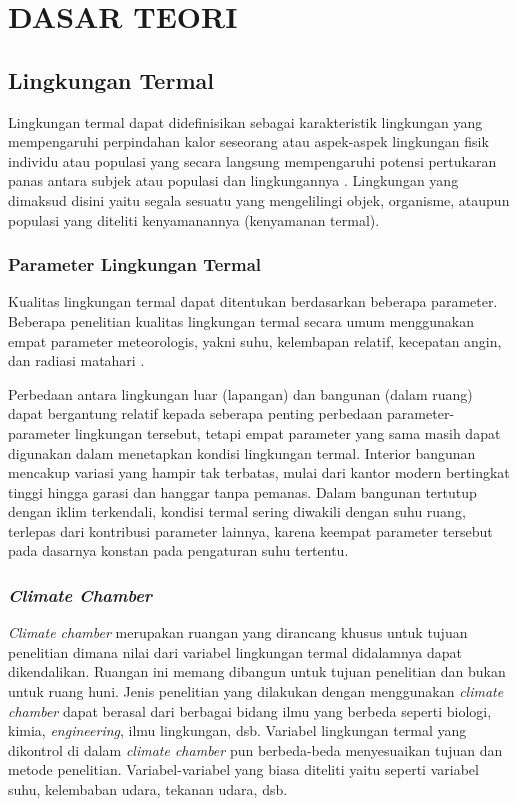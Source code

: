 \chapter{DASAR TEORI}
\label{dasar-teori}

\section{Lingkungan Termal}

Lingkungan termal dapat didefinisikan sebagai karakteristik lingkungan yang mempengaruhi perpindahan kalor seseorang \cite{ASHRAE55} atau aspek-aspek lingkungan fisik individu atau populasi yang secara langsung mempengaruhi potensi pertukaran panas antara subjek atau populasi dan lingkungannya \cite{book1}. Lingkungan yang dimaksud disini yaitu segala sesuatu yang mengelilingi objek, organisme, ataupun populasi yang diteliti kenyamanannya (kenyamanan termal).

\subsection{Parameter Lingkungan Termal}

Kualitas lingkungan termal dapat ditentukan berdasarkan beberapa parameter. Beberapa penelitian kualitas lingkungan termal secara umum menggunakan empat parameter meteorologis, yakni suhu, kelembapan relatif, kecepatan angin, dan radiasi matahari \cite{book1}.

Perbedaan antara lingkungan luar (lapangan) dan bangunan (dalam ruang) dapat bergantung relatif kepada seberapa penting perbedaan parameter-parameter lingkungan tersebut, tetapi empat parameter yang sama masih dapat digunakan dalam menetapkan kondisi lingkungan termal. Interior bangunan mencakup variasi yang hampir tak terbatas, mulai dari kantor modern bertingkat tinggi hingga garasi dan hanggar tanpa pemanas. Dalam bangunan tertutup dengan iklim terkendali, kondisi termal sering diwakili dengan suhu ruang, terlepas dari kontribusi parameter lainnya, karena keempat parameter tersebut pada dasarnya konstan pada pengaturan suhu tertentu.

\subsection{\textit{Climate Chamber}}

\textit{Climate chamber} merupakan ruangan yang dirancang khusus untuk tujuan penelitian dimana nilai dari variabel lingkungan termal didalamnya dapat dikendalikan. Ruangan ini memang dibangun untuk tujuan penelitian dan bukan untuk ruang huni. Jenis penelitian yang dilakukan dengan menggunakan \textit{climate chamber} dapat berasal dari berbagai bidang ilmu yang berbeda seperti biologi, kimia, \textit{engineering}, ilmu lingkungan, dsb. Variabel lingkungan termal yang dikontrol di dalam \textit{climate chamber} pun berbeda-beda menyesuaikan tujuan dan metode penelitian. Variabel-variabel yang biasa diteliti yaitu seperti variabel suhu, kelembaban udara, tekanan udara, dsb.

